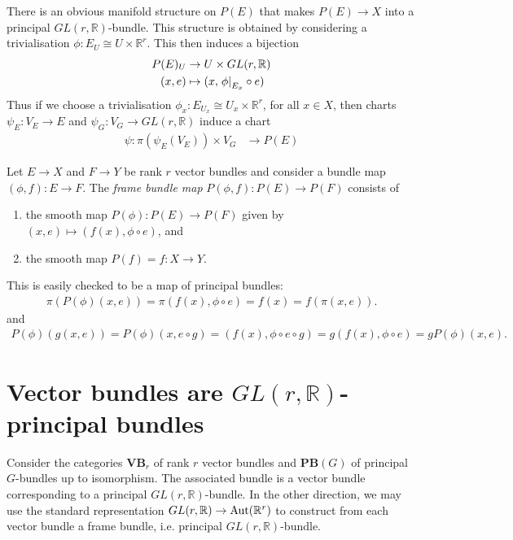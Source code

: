 \documentclass{article}
\begin{document}
There is an obvious manifold structure on $P(E)$ that
makes $P(E)\to X$ into a principal $GL(r,\mathbb{R})$-bundle.
This structure is obtained by considering a trivialisation
$\phi:E_U\cong U\times\mathbb{R}^r$. This then induces a bijection
\begin{align*}
  P(E)_U &\to U \times GL(r,\mathbb{R}) \\
  (x,e) &\mapsto (x,\left.{\phi}\right\vert_{E_x}\circ e)
\end{align*}
Thus if we choose a trivialisation $\phi_x : E_{U_x} \cong U_x \times
\mathbb{R}^r$, for all $x\in X$, then charts $\psi_E : V_E\to E$ and $\psi_G :
V_G \to GL(r,\mathbb{R})$ induce a chart
\begin{align*}
  \psi : \pi(\psi_E(V_E)) \times V_G &\to P(E)
\end{align*}
\missingproof

\begin{definition}
  Let $E\to X$ and $F\to Y$ be rank $r$ vector bundles and
  consider a bundle map $(\phi,f):E\to F$. The \emph{frame bundle
  map} $P(\phi,f):P(E)\to P(F)$ consists of
  \begin{enumerate}
    \item the smooth map $P(\phi):P(E)\to P(F)$ given by
      $(x,e)\mapsto (f(x),\phi\circ e)$, and
    \item the smooth map $P(f)=f:X\to Y$.
  \end{enumerate}
\end{definition}

This is easily checked to be a map of principal bundles:
\begin{align*}
  \pi(P(\phi)(x,e)) = \pi(f(x),\phi\circ e) = f(x) = f(\pi(x,e)).
\end{align*}
and
\begin{align*}
  P(\phi)(g(x,e))
  = P(\phi)(x, e\circ g)
  = (f(x),\phi\circ e\circ g)
  = g(f(x),\phi\circ e)
  = gP(\phi)(x,e).
\end{align*}

\section{Vector bundles are $GL(r,\mathbb{R})$-principal bundles}

Consider the categories $\textbf{VB}_r$ of rank $r$ vector bundles
and $\textbf{PB}(G)$ of principal $G$-bundles up to isomorphism.
The associated bundle is a vector bundle corresponding to a
principal $GL(r,\mathbb{R})$-bundle. In the other direction,
we may use the standard representation
$GL(r,\mathbb{R})\to\operatorname{Aut}(\mathbb{R}^r)$ to construct from each
vector bundle a frame bundle, i.e. principal $GL(r,\mathbb{R})$-bundle.
\end{document}
